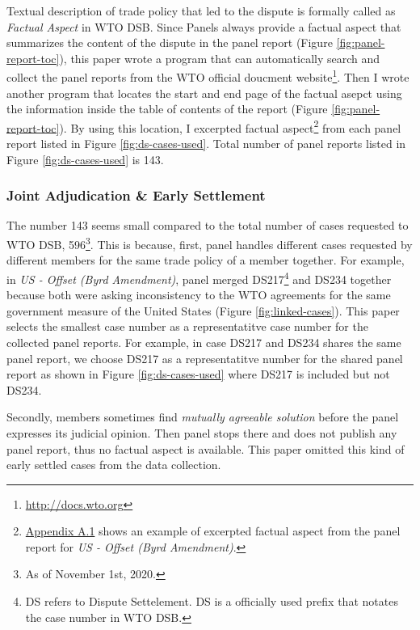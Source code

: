 Textual description of trade policy that 
led to the dispute is formally called as
\textit{Factual Aspect} in WTO DSB. 
Since Panels
always provide a factual aspect
that summarizes the content of the dispute
in the panel report (Figure \ref{fig:panel-report-toc}),
this paper wrote a program that can 
automatically search and collect 
the panel reports from the WTO official doucment website\footnote{
    \url{http://docs.wto.org}
}.
Then I wrote another program that locates the start 
and end page of the factual asepct using the information inside the 
table of contents of the report (Figure \ref{fig:panel-report-toc}).
By using this location, I excerpted factual aspect\footnote{
    \hyperref[sub:factual-aspect-example]{Appendix A.1} shows an
    example of excerpted factual aspect from the panel report for \textit{US - Offset (Byrd Amendment)}.    
}
from each panel report listed in Figure \ref{fig:ds-cases-used}. 
Total number of panel reports listed in Figure \ref{fig:ds-cases-used} is 143.

\subsubsection{Joint Adjudication \& Early Settlement}

The number 143 seems small compared to the total number of cases requested to WTO DSB, 596\footnote
{
    As of November 1st, 2020.
}. This is because, first, panel handles different cases requested by different members
for the same trade policy of a member together. For example, in \textit{US - Offset (Byrd Amendment)}, panel merged DS217\footnote{
    DS refers to Dispute Settelement. DS is a officially used prefix that notates the case number in WTO DSB.
} and DS234 together because both were asking inconsistency to the WTO agreements for the same government measure of the United States (Figure \ref{fig:linked-cases}). This paper selects the smallest case number as a representatitve case number for the collected panel reports. For example, in case DS217 and DS234 shares the same panel report, we choose DS217 as a representatitve number for the shared panel report as shown in Figure \ref{fig:ds-cases-used} where DS217 is included but not DS234.

Secondly, members sometimes find \textit{mutually agreeable solution} before the panel expresses its judicial opinion. Then panel stops there and does not publish any panel report, thus no factual aspect is available. This paper omitted this kind of early settled cases from the data collection.

